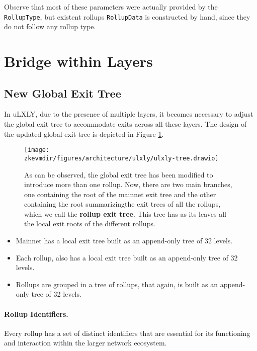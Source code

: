 Observe that most of these parameters were actually provided by the \texttt{RollupType}, but existent rollups \texttt{RollupData} is constructed by hand, since they do not follow any rollup type.









\section{Bridge within Layers}


\subsection{New Global Exit Tree}

In uLXLY, due to the presence of multiple layers, it becomes necessary to
adjust the global exit tree to accommodate exits across all these layers. The
design of the updated global exit tree is depicted in Figure
\ref{fig:ulxly-tree}.

\begin{figure}[h]
\centering
\texttt{[image: \\zkevmdir/figures/architecture/ulxly/ulxly-tree.drawio]}
\caption{As can be observed, the global exit tree has been modified to
introduce more than one rollup. Now, there are two main branches, one
containing the root of the mainnet exit tree and the other containing the root
summarizingthe exit trees of all the rollups, which we call the \textbf{rollup
exit tree}. This tree has as its leaves all the local exit roots of the
different rollups.}
\label{fig:ulxly-tree}
\end{figure}

\begin{itemize}
\item Mainnet has a local exit tree built as an append-only tree of 32 levels.
\item Each rollup, also has a local exit tree built as an append-only tree of 32 levels.
\item Rollups are grouped in a tree of rollups, that again, is built as an append-only tree of 32 levels.
\end{itemize}



\paragraph*{Rollup Identifiers.} Every rollup has a set of distinct identifiers that are essential for its functioning and interaction within the larger network ecosystem.


